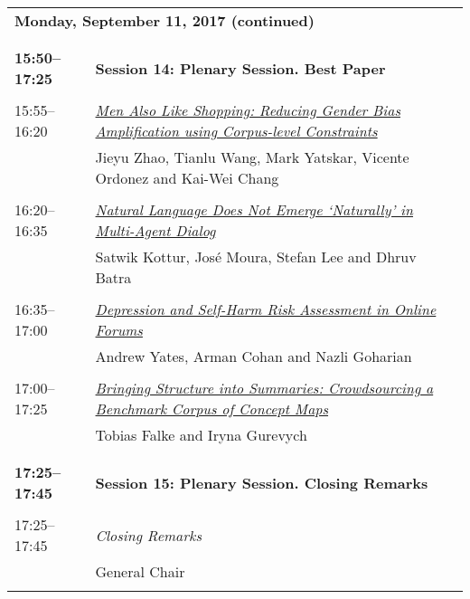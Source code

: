 \newpage
\begin{tabular}{p{20mm}p{128mm}}
\\
\multicolumn{2}{l}{\bf Monday, September 11, 2017 (continued)} \\\\
\\{\bf 15:50--17:25} & {\bf Session 14: Plenary Session. Best Paper } \\
\\
15:55--16:20 & \hyperlink{page.2934}{\em Men Also Like Shopping: Reducing Gender Bias Amplification using Corpus-level Constraints}\\
         & Jieyu Zhao, Tianlu Wang, Mark Yatskar, Vicente Ordonez and Kai-Wei Chang \\
\\

16:20--16:35 & \hyperlink{page.2945}{\em Natural Language Does Not Emerge ‘Naturally’ in Multi-Agent Dialog}\\
         & Satwik Kottur, Jos\'{e} Moura, Stefan Lee and Dhruv Batra \\
\\

16:35--17:00 & \hyperlink{page.2951}{\em Depression and Self-Harm Risk Assessment in Online Forums}\\
         & Andrew Yates, Arman Cohan and Nazli Goharian \\
\\

17:00--17:25 & \hyperlink{page.2962}{\em Bringing Structure into Summaries: Crowdsourcing a Benchmark Corpus of Concept Maps}\\
         & Tobias Falke and Iryna Gurevych \\
\\

\\{\bf 17:25--17:45} & {\bf Session 15: Plenary Session. Closing Remarks } \\
\\
17:25--17:45 & {\em Closing Remarks}\\
         & General Chair\\
\\


\end{tabular}
